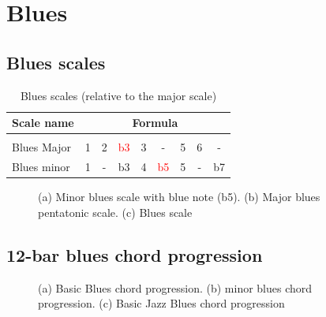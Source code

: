 \documentclass{article}
\begin{document}
\newpage
\section{Blues}

\subsection{Blues scales}

\begin{table}[!h]
	\caption{Blues scales (relative to the major scale)}
	\centering
	\begin{tabular}{l|cccccccc}
		Scale name  & \multicolumn{8}{c}{Formula} \\
		\hline \hline \vspace{-0.4cm} \\
		Blues Major   & 1 & 2  & \textcolor{red}{b3} & 3  &   -   & 5  & 6  &  -  \\
		Blues minor   & 1 &  - & b3 & 4  & \textcolor{red}{b5} &  5  & - &  b7 \\
	\end{tabular}
	\label{tab: }
\end{table}


\begin{figure}[!h]
	\centering
	\hspace*{-1cm}
	\scalebox{0.7}{}
	\hspace*{-1cm}
	\scalebox{0.7}{}
	\hspace*{-1cm}
	\scalebox{0.7}{}
	\caption{(a) Minor blues scale with blue note (b5). (b) Major blues pentatonic scale. (c) Blues scale  }
	\label{fig:}
\end{figure}


\subsection{12-bar blues chord progression}

\begin{figure}[!h]
    \centering
	\hspace*{0cm}
	\scalebox{1.5}{}
	\scalebox{1.5}{}
	\scalebox{1.5}{}
	\caption{(a) Basic Blues chord progression. (b) minor blues chord progression. (c) Basic Jazz Blues chord progression}
	\label{fig:}
\end{figure}
\end{document}
